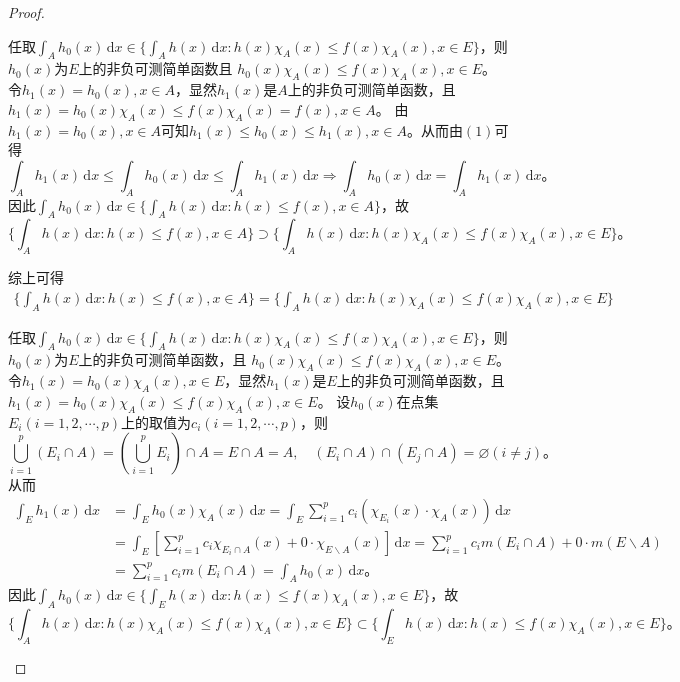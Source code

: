 \documentclass[../../main.tex]{subfiles}
\begin{document}
\begin{proof}
\begin{enumerate}[(1)]
任取$\int_A h_0(x)\,\mathrm{d}x \in \{\int_A h(x)\,\mathrm{d}x : h(x) \chi_A(x) \leqslant f(x) \chi_A(x), x \in E\}$，则$h_0(x)$为$E$上的非负可测简单函数且
$h_0(x) \chi_A(x) \leqslant f(x) \chi_A(x), x \in E$。
令$h_1(x) = h_0(x), x \in A$，显然$h_1(x)$是$A$上的非负可测简单函数，且
$h_1(x) = h_0(x) \chi_A(x) \leqslant f(x) \chi_A(x) = f(x), x \in A$。
由$h_1(x) = h_0(x), x \in A$可知$h_1(x) \leqslant h_0(x) \leqslant h_1(x), x \in A$。从而由$(1)$可得
\[
\int_A h_1(x)\,\mathrm{d}x \leqslant \int_A h_0(x)\,\mathrm{d}x \leqslant \int_A h_1(x)\,\mathrm{d}x \Rightarrow \int_A h_0(x)\,\mathrm{d}x = \int_A h_1(x)\,\mathrm{d}x。
\]
因此$\int_A h_0(x)\,\mathrm{d}x \in \{\int_A h(x)\,\mathrm{d}x : h(x) \leqslant f(x), x \in A\}$，故
\[
\{\int_A h(x)\,\mathrm{d}x : h(x) \leqslant f(x), x \in A\} \supset \{\int_A h(x)\,\mathrm{d}x : h(x) \chi_A(x) \leqslant f(x) \chi_A(x), x \in E\}。
\]

综上可得
\begin{align}
\{\int_A h(x)\,\mathrm{d}x : h(x) \leqslant f(x), x \in A\} = \{\int_A h(x)\,\mathrm{d}x : h(x) \chi_A(x) \leqslant f(x) \chi_A(x), x \in E\}\label{equation:100.79}
\end{align}

任取$\int_A h_0(x)\,\mathrm{d}x \in \{\int_A h(x)\,\mathrm{d}x : h(x) \chi_A(x) \leqslant f(x) \chi_A(x), x \in E\}$，则$h_0(x)$为$E$上的非负可测简单函数，且
$h_0(x) \chi_A(x) \leqslant f(x) \chi_A(x), x \in E$。
令$h_1(x) = h_0(x) \chi_A(x), x \in E$，显然$h_1(x)$是$E$上的非负可测简单函数，且
$h_1(x) = h_0(x) \chi_A(x) \leqslant f(x) \chi_A(x), x \in E$。
设$h_0(x)$在点集$E_i (i = 1,2,\cdots,p)$上的取值为$c_i (i = 1,2,\cdots,p)$，则
\[
\bigcup_{i=1}^p (E_i\cap A) = (\bigcup_{i=1}^p E_i) \cap A = E\cap A = A,\quad (E_i\cap A) \cap (E_j\cap A) = \varnothing (i\ne j)。
\]
从而
\begin{align*}
\int_E h_1(x)\,\mathrm{d}x &= \int_E h_0(x) \chi_A(x)\,\mathrm{d}x = \int_E \sum_{i=1}^p c_i (\chi_{E_i}(x) \cdot \chi_A(x))\,\mathrm{d}x \\
&= \int_E \left[ \sum_{i=1}^p c_i \chi_{E_i\cap A}(x) + 0 \cdot \chi_{E\backslash A}(x) \right]\,\mathrm{d}x = \sum_{i=1}^p c_i m(E_i\cap A) + 0 \cdot m(E\backslash A) \\
&= \sum_{i=1}^p c_i m(E_i\cap A) = \int_A h_0(x)\,\mathrm{d}x。
\end{align*}
因此$\int_A h_0(x)\,\mathrm{d}x \in \{\int_E h(x)\,\mathrm{d}x : h(x) \leqslant f(x) \chi_A(x), x \in E\}$，故
\[
\{\int_A h(x)\,\mathrm{d}x : h(x) \chi_A(x) \leqslant f(x) \chi_A(x), x \in E\} \subset \{\int_E h(x)\,\mathrm{d}x : h(x) \leqslant f(x) \chi_A(x), x \in E\}。
\]


\end{enumerate}
\end{proof}
\end{document}
